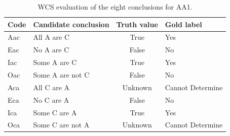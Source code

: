 \begin{table}[htbp]
\centering
\caption{WCS evaluation of the eight conclusions for AA1.}
\label{tab:aa1-wcs}
\begin{tabular}{llcl}
\toprule
Code & Candidate conclusion & Truth value & Gold label \\
\midrule
Aac & All A are C & True & Yes \\
Eac & No A are C & False & No \\
Iac & Some A are C & True & Yes \\
Oac & Some A are not C & False & No \\
Aca & All C are A & Unknown & Cannot Determine \\
Eca & No C are A & False & No \\
Ica & Some C are A & True & Yes \\
Oca & Some C are not A & Unknown & Cannot Determine \\
\bottomrule
\end{tabular}
\end{table}
